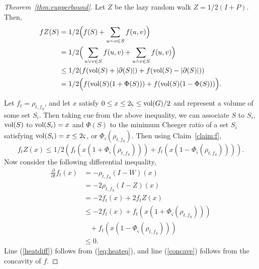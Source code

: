 \documentclass[runningheads,a4paper]{llncs}
\newcommand{\vol}{\textmd{vol}}
\begin{document}
\begin{proof}[Theorem~\ref{thm:eupperbound}]
Let $Z$ be the lazy random walk $Z = 1/2(I + P)$.  Then,
\begin{align*}
fZ(S) &= 1/2\Big( f(S) + \sum\limits_{u\sim v \in S} f(u,v) \Big)\\
&= 1/2\Big( \sum\limits_{u \vee v \in S} f(u,v) + \sum\limits_{u \wedge v \in S} f(u,v) \Big)\\
&\leq 1/2(f(\vol(S) + |\partial(S)|) + f(\vol(S) - |\partial(S)|))\\
&= 1/2\Big(f(\vol(S)(1 + \Phi(S))) + f(\vol(S)(1 - \Phi(S)))\Big).
\end{align*}

Let $f_t = \rho_{t,f_S}$, and let $x$ satisfy $0 \leq x \leq 2\varsigma \leq
\vol(G)/2$ and represent a volume of some set $S_i$.  Then taking cue from the
above inequality, we can associate $S$ to $S_i$, $\vol(S)$ to $\vol(S_i) = x$
and $\Phi(S)$ to the minimum Cheeger ratio of a set $S_i$ satisfying $\vol(S_i)
= x \leq 2\varsigma$, or $\Phi_{\varsigma}(\rho_{t,f_S})$.  Then using Claim~\ref{claim:f},
\[ f_tZ(x) \leq 1/2(f_t(x(1+\Phi_{\varsigma}(\rho_{t,f_S}))) + f_t(x(1-\Phi_{\varsigma}(\rho_{t,f_S})))).  \]
Now consider the following differential inequality,
\begin{align}
\frac{\partial}{\partial t}f_t(x) &= -\rho_{t,f_S}(I-W)(x)\label{heatdiff}\\
&= -2\rho_{t,f_S}(I-Z)(x)\nonumber\\
&= -2f_t(x) + 2f_tZ(x)\nonumber\\
&\leq -2f_t(x) + f_t(x(1+\Phi_{\varsigma}(\rho_{t,f_S})))\nonumber\\
&~~~~+ f_t(x(1-\Phi_{\varsigma}(\rho_{t,f_S})))\label{diffin}\\
&\leq 0.\label{concave}
\end{align}
Line (\ref{heatdiff}) follows from (\ref{eq:heateq}), and line (\ref{concave})
follows from the concavity of $f$.


\end{proof}
\end{document}
